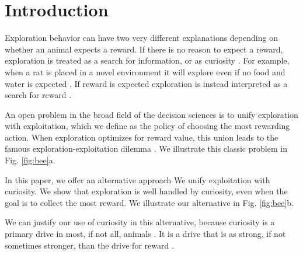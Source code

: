 \section*{Introduction}
Exploration behavior can have two very different explanations depending on whether an animal expects a reward. If there is no reason to expect a reward, exploration is treated as a search for information, or as curiosity \cite{Berlyne1950,Schmidhuber1991,Kidd2015,Jaegle2019,Sumner2019,Wang2019,Auersperg2015}. For example, when a rat is placed in a novel environment it will explore even if no food and water is expected \cite{Berlyne1950,Rosenberg2021}. If reward is expected exploration is instead interpreted as a search for reward \cite{Gupta2006,Sutton2018,Woodgate2017,Lee2011a,Schulz2018a,Calhoun2014}. 

An open problem in the broad field of the decision sciences is to unify exploration with exploitation, which we define as the policy of choosing the most rewarding action. When exploration optimizes for reward value, this union leads to the famous exploration-exploitation dilemma \citep{Kelly1956,Berger-Tal2014,Dayan1996,Thrun1992,Mehlhorn2015,Kobayashi2019}. We illustrate this classic problem in Fig. \ref{fig:bee}a.

In this paper, we offer an alternative approach We unify exploitation with curiosity. We show that exploration is well handled by curiosity, even when the goal is to collect the most reward. We illustrate our alternative in Fig. \ref{fig:bee}b. 

We can justify our use of curiosity in this alternative, because curiosity is a primary drive in most, if not all, animals \cite{Berlyne1950,Loewenstein1994,Inglis2001}. It is a drive that is as strong, if not sometimes stronger, than the drive for reward \cite{Loewenstein1994,Kidd2015,Gottlieb2018,Sumner2019,Gopnik2020,Song2019,Wang2019}. 

